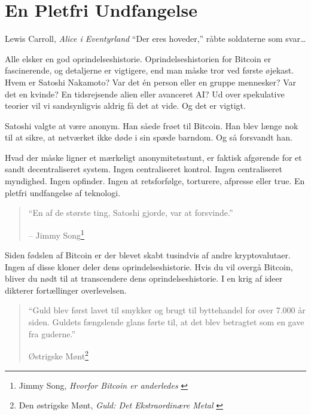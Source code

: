 \chapter{En Pletfri Undfangelse}
\label{les:5}

\begin{chapquote}{Lewis Carroll, \textit{Alice i Eventyrland}}
\enquote{Der eres hoveder,} råbte soldaterne som svar\ldots
\end{chapquote}

Alle elsker en god oprindelseshistorie. Oprindelseshistorien for Bitcoin er 
fascinerende, og detaljerne er vigtigere, end man måske tror ved første 
øjekast. Hvem er Satoshi Nakamoto? Var det én person eller en gruppe mennesker? 
Var det en kvinde? En tidsrejsende alien eller avanceret AI? Ud over spekulative
teorier vil vi sandsynligvis aldrig få det at vide. Og det er vigtigt.

Satoshi valgte at være anonym. Han såede frøet til Bitcoin. Han blev længe nok 
til at sikre, at netværket ikke døde i sin spæde barndom. Og så forsvandt han.

Hvad der måske ligner et mærkeligt anonymitetsstunt, er faktisk afgørende for 
et sandt decentraliseret system. Ingen centraliseret kontrol. Ingen 
centraliseret myndighed. Ingen opfinder. Ingen at retsforfølge, torturere, 
afpresse eller true. En pletfri undfangelse af teknologi.

\begin{quotation}\begin{samepage}
\enquote{En af de største ting, Satoshi gjorde, var at forsvinde.}
\begin{flushright} -- Jimmy Song\footnote{Jimmy Song, \textit{Hvorfor Bitcoin
    er anderledes} \cite{bitcoin-different}}
\end{flushright}\end{samepage}\end{quotation}

\newpage

Siden fødslen af Bitcoin er der blevet skabt tusindvis af andre kryptovalutaer. 
Ingen af disse kloner deler dens oprindelseshistorie. Hvis du vil overgå 
Bitcoin, bliver du nødt til at transcendere dens oprindelseshistorie. I en krig 
af ideer dikterer fortællinger overlevelsen.

\begin{quotation}\begin{samepage}
\enquote{Guld blev først lavet til smykker og brugt til byttehandel for over 
7.000 år siden. Guldets fængslende glans førte til, at det blev betragtet som 
en gave fra guderne.}
\begin{flushright} Østrigske Mønt\footnote{Den østrigske Mønt, \textit{Guld: 
    Det Ekstraordinære Metal} \cite{gold-gift-gods}}
\end{flushright}\end{samepage}\end{quotation}

